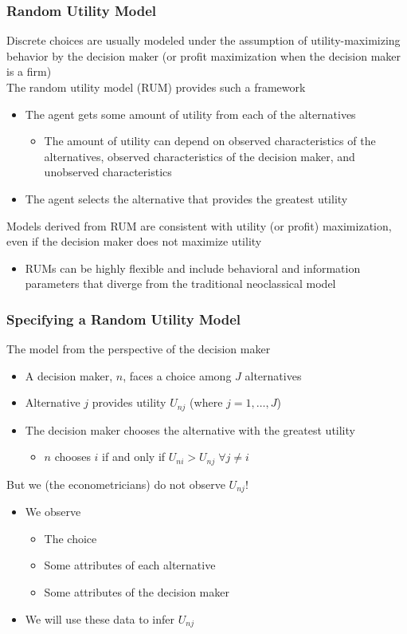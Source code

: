 \documentclass{beamer}\usepackage[]{graphicx}\usepackage[]{color}
\begin{document}
\begin{frame}\frametitle{Random Utility Model}
    Discrete choices are usually modeled under the assumption of utility-maximizing behavior by the decision maker (or profit maximization when the decision maker is a firm) \\
    \vspace{2ex} 
    The random utility model (RUM) provides such a framework
    \begin{itemize}
    	\item The agent gets some amount of utility from each of the alternatives
    	\begin{itemize}
    		\item The amount of utility can depend on observed characteristics of the alternatives, observed characteristics of the decision maker, and unobserved characteristics
    	\end{itemize}
    	\item The agent selects the alternative that provides the greatest utility
    \end{itemize}
    \vspace{2ex}
    Models derived from RUM are consistent with utility (or profit) maximization, even if the decision maker does not maximize utility
    \begin{itemize}
    	\item RUMs can be highly flexible and include behavioral and information parameters that diverge from the traditional neoclassical model
    \end{itemize}
\end{frame}

\begin{frame}\frametitle{Specifying a Random Utility Model}
	The model from the perspective of the decision maker
	\begin{itemize}
		\item A decision maker, $n$, faces a choice among $J$ alternatives
    	\item Alternative $j$ provides utility $U_{nj}$ (where $j = 1, \ldots, J$)
    	\item The decision maker chooses the alternative with the greatest utility
    	\begin{itemize}
    		\item $n$ chooses $i$ if and only if $U_{ni} > U_{nj} \; \forall j \neq i$
    	\end{itemize}
   	\end{itemize}
   	\vspace{3ex}
   	But we (the econometricians) do not observe $U_{nj}$!
   	\begin{itemize}
   		\item We observe
   		\begin{itemize}
   			\item The choice
   			\item Some attributes of each alternative
   			\item Some attributes of the decision maker
   		\end{itemize}
   		\item We will use these data to infer $U_{nj}$
   	\end{itemize}
\end{frame}
\end{document}
